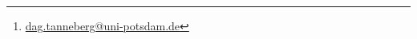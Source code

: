 \usepackage[ngerman]{babel}
\usepackage{booktabs}
\usepackage{graphicx}
\usepackage{hyperref}
\usepackage{multirow}
\usepackage{adjustbox}
\usepackage{amsmath}
\usepackage{tikz}
    \usetikzlibrary{positioning}

\author{Dag Tanneberg\thanks{%
  \href{mailto:dag.tanneberg@uni-potsdam.de}%
    {dag.tanneberg@uni-potsdam.de}
  }, Sebastian Eppner, Steffen Ganghof
}
\hypersetup{colorlinks, urlcolor = red, linkcolor = }